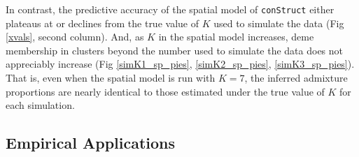 \documentclass[12pt]{article}
\begin{document}
In contrast, the predictive accuracy of the spatial model of \texttt{conStruct} 
either plateaus at or declines from the true value of $K$ used to simulate the data (Fig \ref{xvals}, second column).
And, as $K$ in the spatial model increases, 
deme membership in clusters beyond the number used to simulate the data does not appreciably increase 
(Fig \ref{simK1_sp_pies}, \ref{simK2_sp_pies}, \ref{simK3_sp_pies}).
That is, even when the spatial model is run with $K=7$, 
the inferred admixture proportions are nearly identical to 
those estimated under the true value of $K$ for each simulation.

\subsection*{Empirical Applications}
\end{document}
